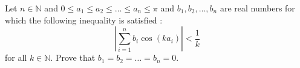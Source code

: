 Let $n\in\mathbb{N}$ and $0\leq a_1\leq a_2\leq\ldots\leq a_n\leq\pi$ and $b_1,b_2,\ldots ,b_n$ are real numbers for which the following inequality is satisfied :
\[\left|\sum_{i=1}^{n} b_i\cos(ka_i)\right|<\frac{1}{k}\]
for all $ k\in\mathbb{N}$. Prove that $ b_1=b_2=\ldots =b_n=0$.